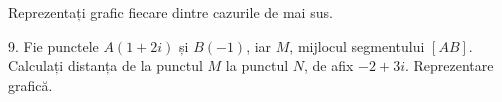 Reprezentați grafic fiecare dintre cazurile de mai sus.

\vspace{0.3cm}

9. Fie punctele $ A(1 + 2i) $ și $ B(-1) $, iar $ M $, mijlocul
segmentului $ [AB] $. Calculați distanța de la punctul $ M $
la punctul $ N $, de afix $ -2 + 3i $. Reprezentare grafică.

